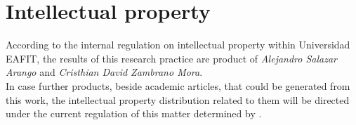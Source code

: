 \documentclass[12pt,letterpaper]{article}
\begin{document}
\section{Intellectual property}

According to the internal regulation on intellectual property within
Universidad EAFIT, the results of this research practice are product of
\emph{Alejandro Salazar Arango} and \emph{Cristhian David Zambrano Mora}.\\

In case further products, beside academic articles, that could be generated from this work, the intellectual property distribution related to them will be directed under the current regulation of this matter determined by \cite{reglamento2017}.



\end{document}
